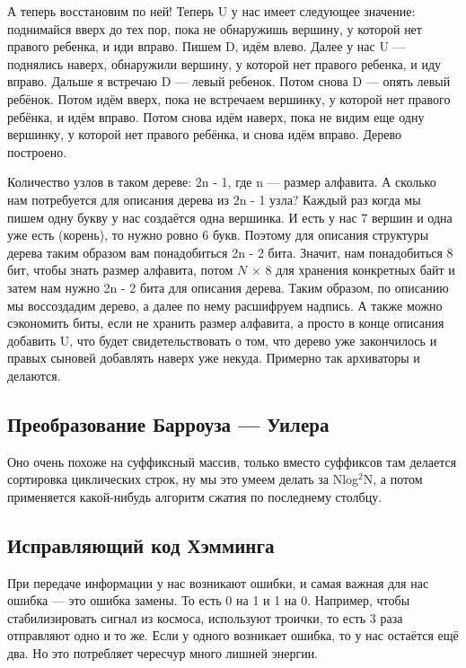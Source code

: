 \documentclass[12pt]{article}
\begin{document}
А теперь восстановим по ней! Теперь U у нас имеет следующее значение: поднимайся вверх до тех пор, пока не обнаружишь вершину, у которой нет правого ребенка, и иди вправо. Пишем D, идём влево. Далее у нас U --- поднялись наверх, обнаружили вершину, у которой нет правого ребенка, и иду вправо. Дальше я встречаю D --- левый ребенок. Потом снова D --- опять левый ребёнок. Потом идём вверх, пока не встречаем вершинку, у которой нет правого ребёнка, и идём вправо. Потом снова идём наверх, пока не видим еще одну вершинку, у которой нет правого ребёнка, и снова идём вправо. Дерево построено.

Количество узлов в таком дереве: 2n - 1, где n --- размер алфавита. А сколько нам потребуется для описания дерева из 2n - 1 узла? Каждый раз когда мы пишем одну букву у нас создаётся одна вершинка. И есть у нас 7 вершин и одна уже есть (корень), то нужно ровно 6 букв. Поэтому для описания структуры дерева таким образом вам понадобиться 2n - 2 бита. Значит, нам понадобиться 8 бит, чтобы знать размер алфавита, потом $N$ $\times$ 8 для хранения конкретных байт и затем нам нужно 2n - 2 бита для описания дерева. Таким образом, по описанию мы воссоздадим дерево, а далее по нему расшифруем надпись. А также можно сэкономить биты, если не хранить размер алфавита, а просто в конце описания добавить U, что будет свидетельствовать о том, что дерево уже закончилось и правых сыновей добавлять наверх уже некуда. Примерно так архиваторы и делаются.

\subsection*{Преобразование Барроуза --- Уилера}
Оно очень похоже на суффиксный массив, только вместо суффиксов там делается сортировка циклических строк, ну мы это умеем делать за Nlog$^2$N, а потом применяется какой-нибудь алгоритм сжатия по последнему столбцу.

\subsection*{Исправляющий код Хэмминга}
При передаче информации у нас возникают ошибки, и самая важная для нас ошибка --- это ошибка замены. То есть 0 на 1 и 1 на 0. Например, чтобы стабилизировать сигнал из космоса, используют троички, то есть 3 раза отправляют одно и то же. Если у одного возникает ошибка, то у нас остаётся ещё два. Но это потребляет чересчур много лишней энергии.
\end{document}
